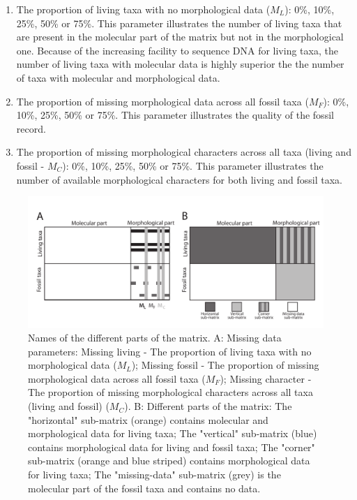 \documentclass[12pt,letterpaper]{article}
\begin{document}
\begin{enumerate}
\item{The proportion of living taxa with no morphological data ($M_{L}$): 0\%, 10\%, 25\%, 50\% or 75\%.}
This parameter illustrates the number of living taxa that are present in the molecular part of the matrix but not in the morphological one.
Because of the increasing facility to sequence DNA for living taxa, the number of living taxa with molecular data is highly superior the the number of taxa with molecular and morphological data.
\item{The proportion of missing morphological data across all fossil taxa ($M_{F}$): 0\%, 10\%, 25\%, 50\% or 75\%.}
This parameter illustrates the quality of the fossil record. 
\item{The proportion of missing morphological characters across all taxa (living and fossil - $M_{C}$): 0\%, 10\%, 25\%, 50\% or 75\%. }
This parameter illustrates the number of available morphological characters for both living and fossil taxa.
\end{enumerate}

\begin{figure}
\centering
\includegraphics[keepaspectratio=true]{Figures/TEM_Fig_missingData-BW.pdf}
\caption{Names of the different parts of the matrix.
A: Missing data parameters:
Missing living - The proportion of living taxa with no morphological data ($M_{L}$);
Missing fossil - The proportion of missing morphological data across all fossil taxa ($M_{F}$);
Missing character - The proportion of missing morphological characters across all taxa (living and fossil) ($M_{C}$).
B: Different parts of the matrix:
The "horizontal" sub-matrix (orange) contains molecular and morphological data for living taxa;
The "vertical" sub-matrix (blue) contains morphological data for living and fossil taxa;
The "corner" sub-matrix (orange and blue striped) contains morphological data for living taxa;
The "missing-data" sub-matrix (grey) is the molecular part of the fossil taxa and contains no data.}
\label{Fig_RemoveData}
\end{figure}
\end{document}
